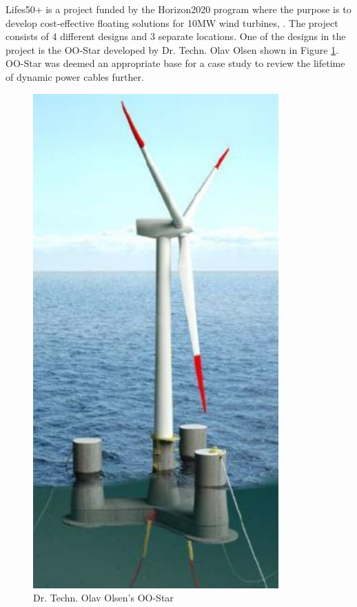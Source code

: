\newline
\newline
Lifes50+ is a project funded by the Horizon2020 program where the purpose is to develop cost-effective floating solutions for 10MW wind turbines, \cite{Horizon2010}. The project consists of 4 different designs and 3 separate locations. One of the designs in the project is the OO-Star developed by Dr. Techn. Olav Olsen shown in Figure \ref{fig:oostarintro}. OO-Star was deemed an appropriate base for a case study to review the lifetime of dynamic power cables further.

\begin{figure}[H]
\centering
\includegraphics[scale=0.5]{figures/oostar}
\caption[$\; \:$Dr. Techn. Olav Olsen's OO-Star]{Dr. Techn. Olav Olsen's OO-Star \cite{Lifes50+D4.2} }
 \label{fig:oostarintro}
\end{figure}


